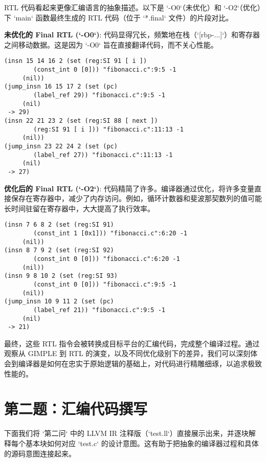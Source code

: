 \documentclass[a4paper]{article}
\begin{document}
RTL 代码看起来更像汇编语言的抽象描述。以下是 `-O0`（未优化）和 `-O2`（优化）下 `main` 函数最终生成的 RTL 代码（位于 `*.final` 文件）的片段对比。

\textbf{未优化的 Final RTL (`-O0`)}:
代码显得冗长，频繁地在栈（`[rbp-...]`）和寄存器之间移动数据。这是因为 `-O0` 旨在直接翻译代码，而不关心性能。
\begin{lstlisting}[language=text, caption={fibonacci.c.273r.final (未优化片段)}]
(insn 15 14 16 2 (set (reg:SI 91 [ i ])
        (const_int 0 [0])) "fibonacci.c":9:5 -1
     (nil))
(jump_insn 16 15 17 2 (set (pc)
        (label_ref 29)) "fibonacci.c":9:5 -1
     (nil)
 -> 29)
(insn 22 21 23 2 (set (reg:SI 88 [ next ])
        (reg:SI 91 [ i ])) "fibonacci.c":11:13 -1
     (nil))
(jump_insn 23 22 24 2 (set (pc)
        (label_ref 27)) "fibonacci.c":11:13 -1
     (nil)
 -> 27)
\end{lstlisting}

\textbf{优化后的 Final RTL (`-O2`)}:
代码精简了许多。编译器通过优化，将许多变量直接保存在寄存器中，减少了内存访问。例如，循环计数器和斐波那契数列的值可能长时间驻留在寄存器中，大大提高了执行效率。
\begin{lstlisting}[language=text, caption={fibonacci.c.340r.final (优化片段)}]
(insn 7 6 8 2 (set (reg:SI 91)
        (const_int 1 [0x1])) "fibonacci.c":6:20 -1
     (nil))
(insn 8 7 9 2 (set (reg:SI 92)
        (const_int 0 [0])) "fibonacci.c":6:20 -1
     (nil))
(insn 9 8 10 2 (set (reg:SI 93)
        (const_int 0 [0])) "fibonacci.c":9:5 -1
     (nil))
(jump_insn 10 9 11 2 (set (pc)
        (label_ref 21)) "fibonacci.c":9:5 -1
     (nil)
 -> 21)
\end{lstlisting}

最终，这些 RTL 指令会被转换成目标平台的汇编代码，完成整个编译过程。通过观察从 GIMPLE 到 RTL 的演变，以及不同优化级别下的差异，我们可以深刻体会到编译器是如何在忠实于原始逻辑的基础上，对代码进行精雕细琢，以追求极致性能的。
\section{第二题：汇编代码撰写}

下面我们将 `第二问` 中的 LLVM IR 注释版（`test.ll`）直接展示出来，并逐块解释每个基本块如何对应 `test.c` 的设计意图。这有助于把抽象的编译器过程和具体的源码意图连接起来。
\end{document}
